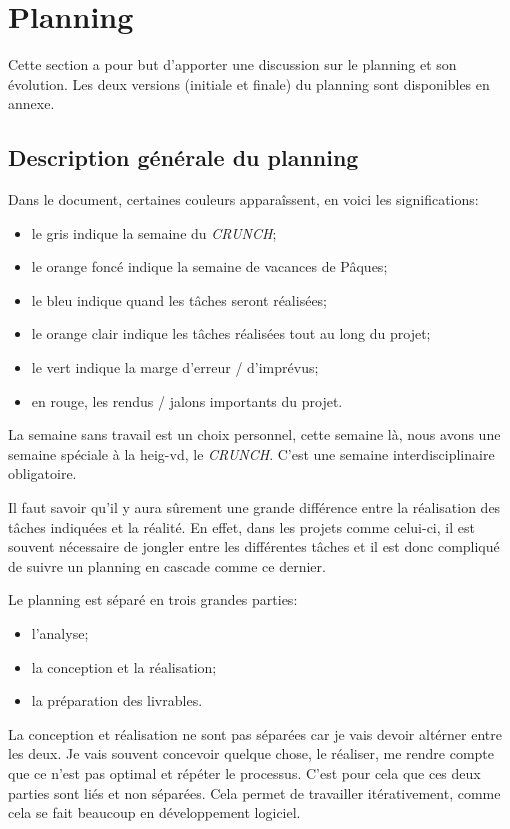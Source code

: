 \documentclass[
    iai, %
    il, %
]{heig-tb}
\begin{document}


\section{Planning}
Cette section a pour but d'apporter une discussion sur le planning et son évolution.
Les deux versions (initiale et finale) du planning sont disponibles en annexe.

\subsection{Description générale du planning}

Dans le document, certaines couleurs apparaîssent, en voici les significations:
\begin{itemize}
    \item le gris indique la semaine du \emph{CRUNCH};
    \item le orange foncé indique la semaine de vacances de Pâques;
    \item le bleu indique quand les tâches seront réalisées;
    \item le orange clair indique les tâches réalisées tout au long du projet;
    \item le vert indique la marge d'erreur / d'imprévus;
    \item en rouge, les rendus / jalons importants du projet.
\end{itemize}

La semaine sans travail est un choix personnel, cette semaine là, nous avons une semaine spéciale à la \Gls{heig-vd}, le \emph{CRUNCH}. C'est une semaine interdisciplinaire obligatoire.

Il faut savoir qu'il y aura sûrement une grande différence entre la réalisation des tâches indiquées
et la réalité. En effet, dans les projets comme celui-ci, il est souvent nécessaire de jongler entre
les différentes tâches et il est donc compliqué de suivre un planning en cascade comme ce dernier.

Le planning est séparé en trois grandes parties:
\begin{itemize}
    \item l'analyse;
    \item la conception et la réalisation;
    \item la préparation des livrables.
\end{itemize}

La conception et réalisation ne sont pas séparées car je vais devoir altérner entre les deux.
Je vais souvent concevoir quelque chose, le réaliser, me rendre compte que ce n'est
pas optimal et répéter le processus. C'est pour cela que ces deux parties sont liés et non séparées.
Cela permet de travailler itérativement, comme cela se fait beaucoup en développement logiciel.
\end{document}

